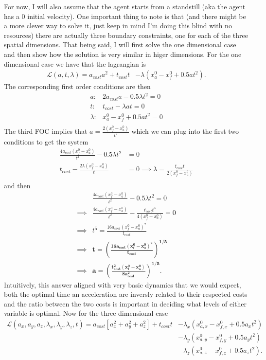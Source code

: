 \documentclass[11pt,english]{article}
\begin{document}
\noindent For now, I will also assume that the agent starts from a standstill (aka the agent has a 0 initial velocity). One important thing to note is that (and there might be a more clever way to solve it, just keep in mind I'm doing this blind with no resources) there are actually three boundary constraints, one for each of the three spatial dimensions. That being said, I will first solve the one dimensional case and then show how the solution is very similar in higer dimensions. For the one dimensional case we have that the lagrangian is
\begin{align*}
	\mathcal{L}(a,t,\lambda) = a_{cost}a^2 + t_{cost}t &- \lambda(x_{a}^0 - x_{f}^0 + 0.5at^2).
\end{align*}
The corresponding first order conditions are then
\begin{align*}
a:& 2a_{cost}a - 0.5\lambda t^2 = 0\\
t:& t_{cost} - \lambda at = 0\\
\lambda:& x_{a}^0 - x_{f}^0 + 0.5at^2 = 0\\
\end{align*}
The third FOC implies that $a = \frac{2(x_f^0 - x_a^0)}{t^2}$ which we can plug into the first two conditions to get the system
\begin{align*}
\frac{4a_{cost}(x_f^0 - x_a^0)}{t^2} - 0.5\lambda t^2 &= 0  \\
t_{cost} - \frac{2\lambda (x_f^0 - x_a^0)}{t}  &= 0 \implies \lambda = \frac{t_{cost}t}{2(x_f^0 - x_a^0)}\\
\end{align*} and then 
\begin{align*}
& \frac{4a_{cost}(x_f^0 - x_a^0)}{t^2} - 0.5\lambda t^2 = 0  \\
\implies & \frac{4a_{cost}(x_f^0 - x_a^0)}{t^2} -  \frac{t_{cost}t^3}{4(x_f^0 - x_a^0)} = 0  \\
\implies & t^5 = \frac{16a_{cost}(x_f^0 - x_a^0)^2}{t_{cost}}\\
\implies & \pmb{t = \left(\frac{16a_{cost}(x_f^0 - x_a^0)^2}{t_{cost}}\right)^{1/5}}\\
\implies & \pmb{a = \left(\frac{t_{cost}^2(x_f^0 - x_a^0)}{8a_{cost}^2}\right)^{1/5}}.
\end{align*}
Intuitively, this answer aligned with very basic dynamics that we would expect, both the optimal time an acceleration are inversly related to their respected costs and the ratio between the two costs is important in deciding what levels of either variable is optimal. Now for the three dimensional case 
\begin{align*}
	\mathcal{L}(a_x,a_y,a_z,\lambda_x,\lambda_y,\lambda_z, t) = a_{cost}\left[a_x^2 + a_y^2 + a_z^2\right] + t_{cost}t &- \lambda_x(x_{a,x}^0 - x_{f,x}^0 + 0.5a_xt^2)\\ &- \lambda_y(x_{a,y}^0 - x_{f,y}^0 + 0.5a_yt^2)\\ &- \lambda_z(x_{a,z}^0 - x_{f,z}^0 + 0.5a_zt^2).
\end{align*}
\end{document}
